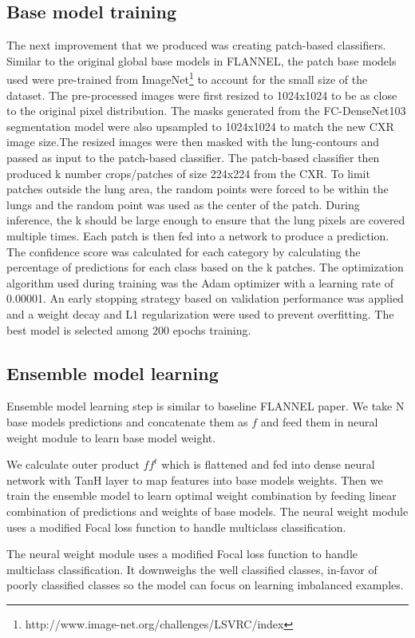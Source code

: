 \documentclass{sigkddExp}
\begin{document}
\subsection{Base model training}
The next improvement that we produced was creating patch-based classifiers.
Similar to the original global base models in FLANNEL, the patch base models
used were pre-trained from
ImageNet\footnote{http://www.image-net.org/challenges/LSVRC/index} to account
for the small size of the dataset. The pre-processed images were first resized
to 1024x1024 to be as close to the original pixel distribution. The masks
generated from the FC-DenseNet103 segmentation model were also upsampled to
1024x1024 to match the new CXR image size.The resized images were then masked
with the lung-contours and passed as input to the patch-based classifier. The
patch-based classifier then produced k number crops/patches of size 224x224 from
the CXR. To limit patches outside the lung area, the random points were forced
to be within the lungs and the random point was used as the center of the patch.
During inference, the k should be large enough to ensure that the lung pixels
are covered multiple times. Each patch is then fed into a network to produce a
prediction. The confidence score was calculated for each category by calculating
the percentage of predictions for each class based on the k patches. The
optimization algorithm used during training was the Adam optimizer with a
learning rate of 0.00001. An early stopping strategy based on validation
performance was applied and a weight decay and L1 regularization were used to
prevent overfitting. The best model is selected among 200 epochs training.

\subsection{Ensemble model learning}
Ensemble model learning step is similar to baseline FLANNEL paper. We take
N base models predictions and concatenate them as $f$ and feed them in neural
weight module to learn base model weight.

We calculate outer product $ff^t$ which is flattened and fed into dense neural
network with TanH layer to map features into base models weights. Then we train
the ensemble model to learn optimal weight combination by feeding linear combination
of predictions and weights of base models. The neural weight module uses a
modified Focal loss function to handle multiclass classification.

The neural weight module uses a modified Focal loss function to handle multiclass
classification. It downweighs the well classified classes, in-favor of
poorly classified classes so the model can focus on learning imbalanced examples.
\end{document}
